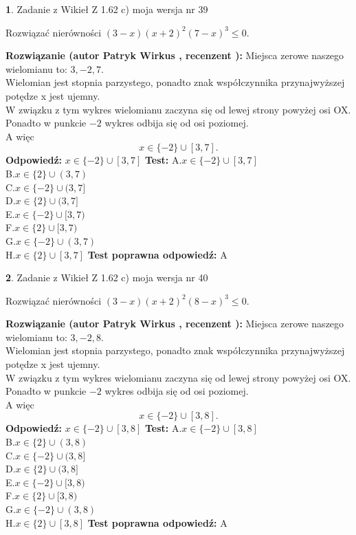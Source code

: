 \documentclass[12pt, a4paper]{article}
\theoremstyle{definition} %
\newtheorem{zad}{}
\newcommand{\zadStart}[1]{\begin{zad}#1\newline}
\newcommand{\zadStop}{\end{zad}}
\newcommand{\rozwStart}[2]{\noindent \textbf{Rozwiązanie (autor #1 , recenzent #2): }\newline}
\newcommand{\rozwStop}{\newline}
\newcommand{\odpStart}{\noindent \textbf{Odpowiedź:}\newline}
\newcommand{\odpStop}{\newline}
\newcommand{\testStart}{\noindent \textbf{Test:}\newline}
\newcommand{\testStop}{\newline}
\newcommand{\kluczStart}{\noindent \textbf{Test poprawna odpowiedź:}\newline}
\newcommand{\kluczStop}{\newline}
\begin{document}
\zadStart{Zadanie z Wikieł Z 1.62 c) moja wersja nr 39}

Rozwiązać nierówności $(3-x)(x+2)^{2}(7-x)^{3}\le0$.
\zadStop
\rozwStart{Patryk Wirkus}{}
Miejsca zerowe naszego wielomianu to: $3, -2, 7$.\\
Wielomian jest stopnia parzystego, ponadto znak współczynnika przy\linebreak najwyższej potędze x jest ujemny.\\ W związku z tym wykres wielomianu zaczyna się od lewej strony powyżej osi OX.\\
Ponadto w punkcie $-2$ wykres odbija się od osi poziomej.\\
A więc $$x \in \{-2\} \cup [3,7].$$
\rozwStop
\odpStart
$x \in \{-2\} \cup [3,7]$
\odpStop
\testStart
A.$x \in \{-2\} \cup [3,7]$\\
B.$x \in \{2\} \cup (3,7)$\\
C.$x \in \{-2\} \cup (3,7]$\\
D.$x \in \{2\} \cup (3,7]$\\
E.$x \in \{-2\} \cup [3,7)$\\
F.$x \in \{2\} \cup [3,7)$\\
G.$x \in \{-2\} \cup (3,7)$\\
H.$x \in \{2\} \cup [3,7]$
\testStop
\kluczStart
A
\kluczStop



\zadStart{Zadanie z Wikieł Z 1.62 c) moja wersja nr 40}

Rozwiązać nierówności $(3-x)(x+2)^{2}(8-x)^{3}\le0$.
\zadStop
\rozwStart{Patryk Wirkus}{}
Miejsca zerowe naszego wielomianu to: $3, -2, 8$.\\
Wielomian jest stopnia parzystego, ponadto znak współczynnika przy\linebreak najwyższej potędze x jest ujemny.\\ W związku z tym wykres wielomianu zaczyna się od lewej strony powyżej osi OX.\\
Ponadto w punkcie $-2$ wykres odbija się od osi poziomej.\\
A więc $$x \in \{-2\} \cup [3,8].$$
\rozwStop
\odpStart
$x \in \{-2\} \cup [3,8]$
\odpStop
\testStart
A.$x \in \{-2\} \cup [3,8]$\\
B.$x \in \{2\} \cup (3,8)$\\
C.$x \in \{-2\} \cup (3,8]$\\
D.$x \in \{2\} \cup (3,8]$\\
E.$x \in \{-2\} \cup [3,8)$\\
F.$x \in \{2\} \cup [3,8)$\\
G.$x \in \{-2\} \cup (3,8)$\\
H.$x \in \{2\} \cup [3,8]$
\testStop
\kluczStart
A
\kluczStop
\end{document}
